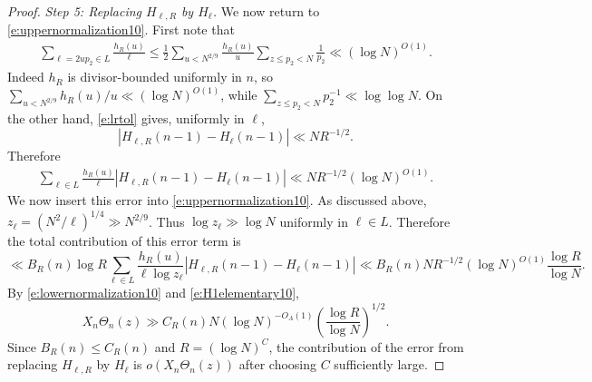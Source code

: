 \documentclass[12pt,reqno]{amsart}
\numberwithin{equation}{section}
\theoremstyle{definition}
\theoremstyle{remark}
\begin{document}
\begin{proof}
\emph{Step 5: Replacing \(H_{\ell,R}\) by \(H_\ell\).}
We now return to \eqref{e:uppernormalization10}.  First note that
\begin{align}\label{e:hroverl}
 \sum_{\ell=2up_2\in L}\frac{h_R(u)}{\ell}
 \leq
 \frac12
 \sum_{u<N^{2/9}}\frac{h_R(u)}u
 \sum_{z\leq p_2<N}\frac1{p_2}
 \ll(\log N)^{O(1)}.
\end{align}
Indeed \(h_R\) is divisor-bounded uniformly in \(n\), so
\(\sum_{u<N^{2/9}}h_R(u)/u\ll(\log N)^{O(1)}\), while
\(\sum_{z\leq p_2<N}p_2^{-1}\ll\log\log N\).  On the other hand,
\eqref{e:lrtol} gives, uniformly in \(\ell\),
\[
 |H_{\ell,R}(n-1)-H_\ell(n-1)|\ll NR^{-1/2}.
\]
Therefore
\begin{align}\label{e:smoothingerror10}
 \sum_{\ell\in L}
 \frac{h_R(u)}\ell
 |H_{\ell,R}(n-1)-H_\ell(n-1)|
 \ll NR^{-1/2}(\log N)^{O(1)}.
\end{align}
We now insert this error into \eqref{e:uppernormalization10}.  As discussed
above, \(z_\ell=(N^2/\ell)^{1/4}\gg N^{2/9}\).  Thus
\(\log z_\ell\gg\log N\) uniformly in \(\ell\in L\).  Therefore the total
contribution of this error term is
\[
 \ll
 B_R(n)\log R
 \sum_{\ell\in L}
 \frac{h_R(u)}{\ell\log z_\ell}
 |H_{\ell,R}(n-1)-H_\ell(n-1)|
 \ll
 B_R(n)NR^{-1/2}(\log N)^{O(1)}
 \frac{\log R}{\log N}.
\]
By \eqref{e:lowernormalization10} and \eqref{e:H1elementary10},
\[
 X_n\Theta_n(z)
 \gg
 C_R(n)N(\log N)^{-O_A(1)}
 \left(\frac{\log R}{\log N}\right)^{1/2}.
\]
Since \(B_R(n)\leq C_R(n)\) and \(R=(\log N)^C\), the contribution of the
error from replacing \(H_{\ell,R}\) by \(H_\ell\) is \(o(X_n\Theta_n(z))\)
after choosing \(C\) sufficiently large.


\end{proof}
\end{document}
